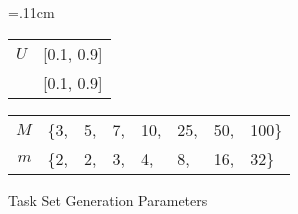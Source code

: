 \begin{figure}[h]
  \centering
  \tabcolsep=.11cm
  \begin{tabular}{|r|l|}
    \hline
    ${U}$ & [0.1, 0.9] \\
    \GFactor{} & [0.1, 0.9] \\
    \hline
  \end{tabular} 
  \begin{tabular}{|r|lllllll|}
    \hline
    ${M}$ & \{3, & 5, & 7, & 10, & 25, & 50, & 100\} \\
    ${m}$ & \{2, & 2, & 3, & 4, & 8, & 16, & 32\} \\
    \hline
  \end{tabular}
  \caption{Task Set Generation Parameters }
  \label{fig:gen-params}
\end{figure}
